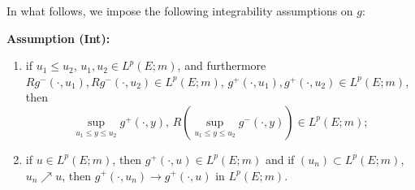 \documentclass[11pt,a4paper,reqno]{amsart}
\theoremstyle{definition}
\numberwithin{equation}{section}
\begin{document}
In what follows, we impose the following integrability assumptions on $g$:

{\bf Assumption (Int):}
\begin{enumerate}
\item[(i)] if $u_1\le u_2$, $u_1,u_2\in L^p(E;m)$, and furthermore 
$Rg^-(\cdot,u_1), Rg^-(\cdot,u_2) \in L^p(E;m)$, $g^+(\cdot,u_1), g^+(\cdot,u_2)\in L^p(E;m)$,
then 
\[
\sup_{u_1\le y\le u_2} g^+(\cdot,y), \,R(\sup_{u_1\le y\le u_2} g^-(\cdot,y))\in L^p(E;m);
\]
\item[(ii)]  if $u\in L^p(E;m)$, then $g^+(\cdot,u)\in L^p(E;m)$ 
and if $(u_n)\subset L^p(E;m)$, $u_n\nearrow u$, then $g^+(\cdot,u_n)\to g^+(\cdot,u)$ in $L^p(E;m)$.
\end{enumerate}
\end{document}
